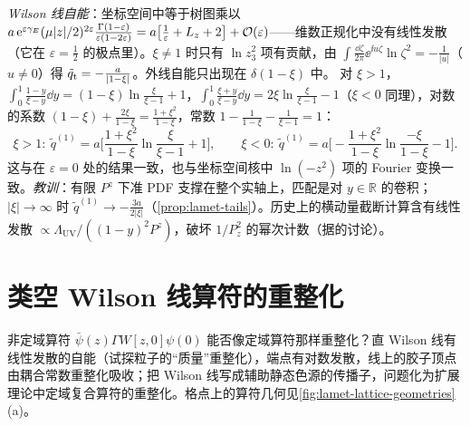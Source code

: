 \begin{example}
\emph{Wilson 线自能}：坐标空间中等于树图乘以 $a\,\mathrm{e}^{\varepsilon\gamma_E}(\mu|z|/2)^{2\varepsilon}\frac{\Gamma(1-\varepsilon)}{\varepsilon(1-2\varepsilon)}=a\big[\frac1\varepsilon+L_z+2\big]+\mathcal{O}\!\left(\varepsilon\right)$——维数正规化中没有线性发散（它在 $\varepsilon=\frac12$ 的极点里）。$\xi\neq1$ 时只有 $\ln z_3^2$ 项有贡献，由 $\int\frac{\dd\zeta}{2\pi}\ee^{\ii u\zeta}\ln\zeta^2=-\frac1{|u|}$（$u\neq0$）得 $\tilde q_{\rm t}=-\frac a{|1-\xi|}$。外线自能只出现在 $\delta(1-\xi)$ 中。
对 $\xi>1$，$\int_0^1\frac{1-y}{\xi-y}\dd y=(1-\xi)\ln\frac\xi{\xi-1}+1$，$\int_0^1\frac{\xi+y}{\xi-y}\dd y=2\xi\ln\frac\xi{\xi-1}-1$（$\xi<0$ 同理），对数的系数 $(1-\xi)+\frac{2\xi}{1-\xi}=\frac{1+\xi^2}{1-\xi}$，常数 $1-\frac1{1-\xi}-\frac1{\xi-1}=1$：
\begin{equation}\label{eq:lamet-unphysical}
\xi>1:\ \tilde q^{(1)}=a\Big[\frac{1+\xi^2}{1-\xi}\ln\frac{\xi}{\xi-1}+1\Big],\qquad
\xi<0:\ \tilde q^{(1)}=a\Big[-\frac{1+\xi^2}{1-\xi}\ln\frac{-\xi}{1-\xi}-1\Big].
\end{equation}%
这与\cite[附录~B]{IzubuchiEtAl2018}在 $\varepsilon=0$ 处的结果一致，也与坐标空间核中 $\ln(-z^2)$ 项的 Fourier 变换一致。\emph{教训}：有限 $P^z$ 下准 PDF 支撑在整个实轴上，匹配是对 $y\in\mathbb R$ 的卷积；$|\xi|\to\infty$ 时 $\tilde q^{(1)}\to-\frac{3a}{2|\xi|}$（\cref{prop:lamet-tails}）。历史上的横动量截断计算\cite{XiongEtAl2014}含有线性发散 $\propto\Lambda_{\mathrm{UV}}/((1-y)^2P^z)$，破坏 $1/P_z^2$ 的幂次计数（据\cite{JiEtAl2021}的讨论）。
\end{example}

\section{类空 Wilson 线算符的重整化}\label{sec:lamet-renorm}

非定域算符 $\bar\psi(z)\Gamma W[z,0]\psi(0)$ 能否像定域算符那样重整化？直 Wilson 线有线性发散的自能（试探粒子的“质量”重整化），端点有对数发散，线上的胶子顶点由耦合常数重整化吸收\cite{Polyakov1980,Dotsenko:1979wb,BrandtNeriSato1981,Craigie:1980qs}；把 Wilson 线写成辅助静态色源的传播子，问题化为扩展理论中定域复合算符的重整化\cite{Dorn:1986dt}。格点上的算符几何见\cref{fig:lamet-lattice-geometries}(a)。

